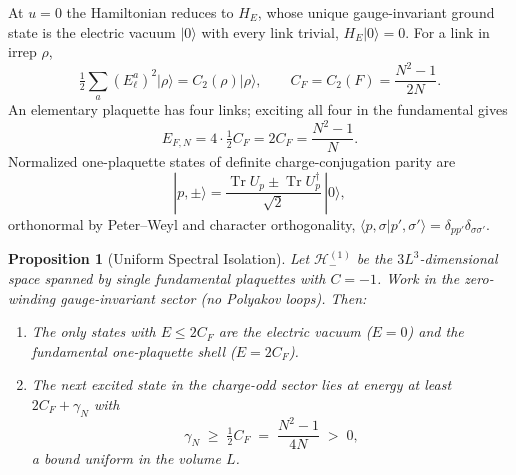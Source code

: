 \documentclass[11pt,a4paper]{article}
\newtheorem{proposition}[theorem]{Proposition}
\theoremstyle{definition}
\DeclareMathOperator{\Tr}{Tr}
\newcommand{\CF}{C_F}
\newcommand{\dg}{^{\dagger}}
\begin{document}
At $u = 0$ the Hamiltonian reduces to $H_E$, whose unique gauge-invariant ground state is the electric vacuum $|0\rangle$ with every link trivial, $H_E|0\rangle = 0$. For a link in irrep $\rho$,
\begin{equation}
  \tfrac{1}{2}\sum_a (E^a_\ell)^2|\rho\rangle = C_2(\rho)|\rho\rangle, \qquad
  \CF = C_2(F) = \frac{N^2-1}{2N}.
\end{equation}
An elementary plaquette has four links; exciting all four in the fundamental gives
\begin{equation}\label{eq:E0_shell}
  E_{F,N} = 4\cdot\tfrac{1}{2}\CF = 2\CF = \frac{N^2-1}{N}.
\end{equation}
Normalized one-plaquette states of definite charge-conjugation parity are
\begin{equation}\label{eq:plaquette_basis}
  |p,\pm\rangle = \frac{\Tr U_p \pm \Tr U_p\dg}{\sqrt{2}}\,|0\rangle ,
\end{equation}
orthonormal by Peter--Weyl and character orthogonality, $\langle p,\sigma|p',\sigma'\rangle = \delta_{pp'}\delta_{\sigma\sigma'}$.

\begin{proposition}[Uniform Spectral Isolation]\label{prop:spectral_isolation}
Let $\mathcal{H}^{(1)}_-$ be the $3L^3$-dimensional space spanned by single fundamental plaquettes with $C=-1$. Work in the zero-winding gauge-invariant sector (no Polyakov loops). Then:
\begin{enumerate}\itemsep1pt
  \item The only states with $E\le 2\CF$ are the electric vacuum ($E=0$) and the fundamental one-plaquette shell ($E = 2\CF$).
  \item The next excited state in the charge-odd sector lies at energy at least $2\CF + \gamma_N$ with
  \begin{equation}
    \gamma_N \;\ge\; \tfrac{1}{2}\CF \;=\; \frac{N^2-1}{4N} \;>\; 0,
  \end{equation}
  a bound uniform in the volume $L$.
\end{enumerate}
\end{proposition}
\end{document}
